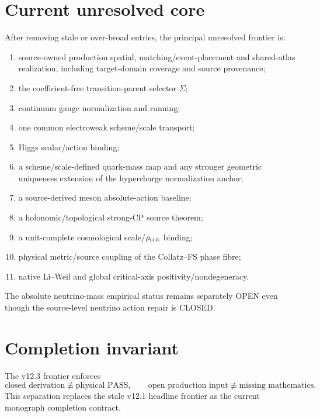 \section{Current unresolved core}

After removing stale or over-broad entries, the principal unresolved frontier
is:
\begin{enumerate}
\item source-owned production spatial, matching/event-placement and shared-atlas
      realization, including target-domain coverage and source provenance;
\item the coefficient-free transition-parent selector \(\Sigma\);
\item continuum gauge normalization and running;
\item one common electroweak scheme/scale transport;
\item Higgs scalar/action binding;
\item a scheme/scale-defined quark-mass map and any stronger geometric
      uniqueness extension of the hypercharge normalization anchor;
\item a source-derived meson absolute-action baseline;
\item a holonomic/topological strong-CP source theorem;
\item a unit-complete cosmological scale/\(\rho_{\rm crit}\) binding;
\item physical metric/source coupling of the Collatz--FS phase fibre;
\item native Li--Weil and global critical-axis positivity/nondegeneracy.
\end{enumerate}

The absolute neutrino-mass empirical status remains separately OPEN even though
the source-level neutrino action repair is CLOSED.

\section{Completion invariant}

The v12.3 frontier enforces
\[
\boxed{
\text{closed derivation}\not\equiv\text{physical PASS},
\qquad
\text{open production input}\not\equiv\text{missing mathematics}.
}
\]
This separation replaces the stale v12.1 headline frontier as the current
monograph completion contract.
